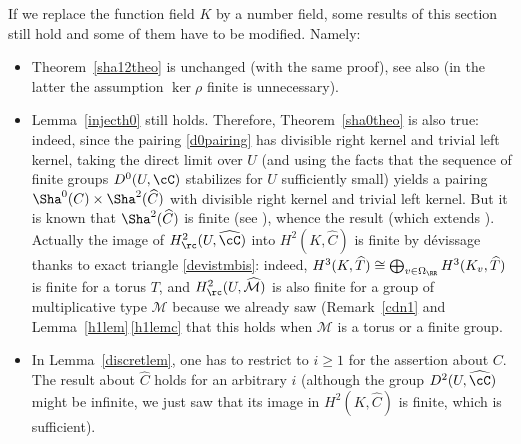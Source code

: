 \begin{rema} \label{cdn3}
If we replace the function field $K$ by a number field, some
results of this section still hold and some of them have to be
modified. Namely:

\begin{itemize}

\item Theorem~\ref{sha12theo} is unchanged (with the same proof), see
also \cite[Th.\,5.7 \& 5.12]{demphd} (in the latter the
assumption $\ker \rho$ finite is unnecessary).

\item Lemma~\ref{injecth0} still holds. Therefore, Theorem~\ref{sha0theo}
is also true: indeed, since the pairing \eqref{d0pairing} has divisible
right kernel and trivial left kernel, taking the direct
limit over $U$ (and using
the facts that the sequence of finite groups $D^0(U,\cC)$ stabilizes
for $U$ sufficiently small) yields a pairing $\Sha^0(C) \times
\Sha^2(\widehat C)$ with divisible right kernel and
trivial left kernel. But it is known that $\Sha^2(\widehat C)$ is finite
(see \cite[Proof of Th.\,5.14]{demphd}), whence the result (which extends
\cite[Th.\,5.23]{demphd}).
Actually the image of $H^2_\rc(U,\widehat \cC)$ into $H^2(K,\widehat C)$ is
finite by dévissage thanks to exact triangle \eqref{devistmbis}:
indeed, $H^3(K,\widehat T) \cong \bigoplus_{v \in \Omega_{\RR}}
H^3(K_v,\widehat T)$ is finite for a torus $T$, and
$H^2_\rc(U,\widehat {\mathcal M})$
is also finite for a group of multiplicative type
$\mathcal M$ because we already saw (\cf Remark~\ref{cdn1}
and Lemma~\ref{h1lem}\,\eqref{h1lemc} that
this holds when $\mathcal M$ is a torus or a finite group.

\item In Lemma~\ref{discretlem}, one has to restrict to $i \geq 1$ for
the assertion about $C$. The result about $\widehat C$ holds for
an arbitrary $i$ (although the group $D^2(U,\widehat \cC)$ might be infinite,
we just saw that
its image in $H^2(K,\widehat C)$ is finite, which is sufficient).


\end{itemize}
\end{rema}
